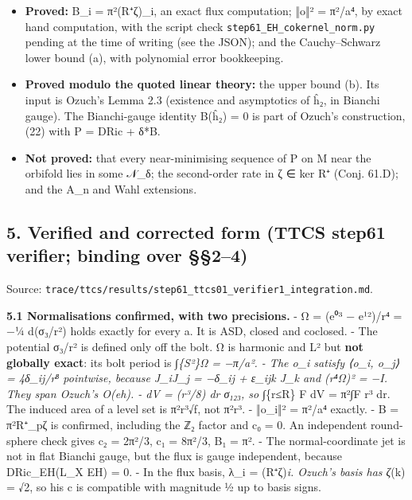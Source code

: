 \documentclass[
  10pt,
]{report}
\providecommand{\tightlist}{%
  \setlength{\itemsep}{0pt}\setlength{\parskip}{0pt}}
\begin{document}
\begin{itemize}
\tightlist
\item
  \textbf{Proved:} B\_i = π²(R⁺ζ)\_i, an exact flux computation; ‖o‖² =
  π²/a⁴, by exact hand computation, with the script check
  \texttt{step61\_EH\_cokernel\_norm.py} pending at the time of writing
  (see the JSON); and the Cauchy--Schwarz lower bound (a), with
  polynomial error bookkeeping.
\item
  \textbf{Proved modulo the quoted linear theory:} the upper bound (b).
  Its input is Ozuch's Lemma 2.3 (existence and asymptotics of ĥ₂, in
  Bianchi gauge). The Bianchi-gauge identity B(ĥ₂) = 0 is part of
  Ozuch's construction, (22) with P = DRic + δ*B.
\item
  \textbf{Not proved:} that every near-minimising sequence of P on M
  near the orbifold lies in some 𝒩\_δ; the second-order rate in ζ ∈ ker
  R⁺ (Conj. 61.D); and the A\_n and Wahl extensions.
\end{itemize}

\hypertarget{verified-and-corrected-form-ttcs-step61-verifier-binding-over-24}{%
\subsection{5. Verified and corrected form (TTCS step61 verifier;
binding over
§§2--4)}\label{verified-and-corrected-form-ttcs-step61-verifier-binding-over-24}}

Source:
\texttt{trace/ttcs/results/step61\_ttcs01\_verifier1\_integration.md}.

\textbf{5.1 Normalisations confirmed, with two precisions.} - Ω = (e⁰³ −
e¹²)/r⁴ = −¼ d(σ₃/r²) holds exactly for every a. It is ASD, closed and
coclosed. - The potential σ₃/r² is defined only off the bolt. Ω is
harmonic and L² but \textbf{not globally exact}: its bolt period is
∫\emph{\{S²\}Ω = −π/a². - The o\_i satisfy ⟨o\_i, o\_j⟩ = 4δ\_ij/r⁸
pointwise, because J\_iJ\_j = −δ\_ij + ε\_ijk J\_k and (r⁴Ω)² = −I. They
span Ozuch's O(eh). - dV = (r³/8) dr σ₁₂₃, so ∫}\{r≤R\} F dV = π²∫F r³
dr. The induced area of a level set is π²r³√f, not π²r³. - ‖o\_i‖² =
π²/a⁴ exactly. - B = π²R⁺\_pζ is confirmed, including the ℤ₂ factor and
c₀ = 0. An independent round-sphere check gives c₂ = 2π²/3, c₁ = 8π²/3,
B₁ = π². - The normal-coordinate jet is not in flat Bianchi gauge, but
the flux is gauge independent, because DRic\_EH(L\_X EH) = 0. - In the
flux basis, λ\_i = (R⁺ζ)\emph{i. Ozuch's basis has
\textbar ζ}(k)\textbar{} = √2, so his c is compatible with magnitude ½
up to basis signs.
\end{document}
